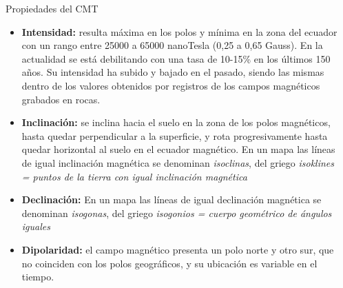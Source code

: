 \begin{frame}
  
  \begin{columns}
    \begin{column}{0.7\textwidth}
  \begin{block}{Propiedades del CMT }{\small
    \begin{itemize}
    \item {\bf Intensidad:} resulta m\'axima en los polos y m\'inima en la zona del ecuador
	con un rango entre 25000 a 65000 nanoTesla (0,25 a 0,65 Gauss). En la actualidad se est\'a
	debilitando con una tasa de 10-15\% en los \'ultimos 150 a\~nos. Su intensidad ha subido y bajado
	en el pasado, siendo las mismas dentro de los valores obtenidos por registros de los campos magn\'eticos
	grabados en rocas.
    \item {\bf Inclinaci\'on:} se inclina hacia el suelo en la zona de los polos magn\'eticos, hasta
	quedar perpendicular a la superficie, y rota progresivamente hasta quedar horizontal al suelo 
	en el ecuador magn\'etico. En un mapa las l\'ineas de igual inclinaci\'on magn\'etica 
	se denominan {\it isoclinas}, del griego {\it isoklines = puntos de la tierra con igual inclinaci\'on
	magn\'etica}
    \item {\bf Declinaci\'on:} 
	En un mapa las l\'ineas de igual declinaci\'on magn\'etica 
	se denominan {\it isogonas}, del griego {\it isogonios = cuerpo geom\'etrico de \'angulos iguales}
    \item {\bf Dipolaridad:} el campo magn\'etico presenta un polo norte y otro sur, que no coinciden
	con los polos geogr\'aficos, y su ubicaci\'on es variable en el tiempo.
    \end{itemize}
  }
\end{block}
\end{column}
\begin{column}{0.3\textwidth}
  \begin{center}

\end{center}
\end{column}
\end{columns}
\end{frame}

